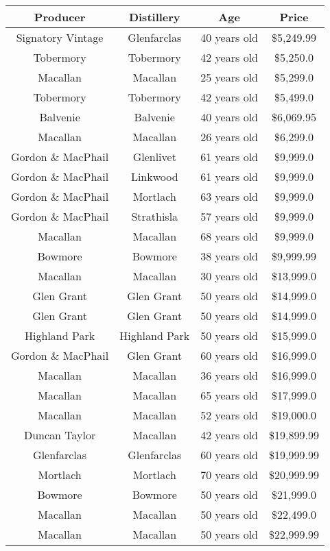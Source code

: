 \begin{appendices}
\begin{center}
 \begin{tabular}{||c | c | c | c  ||} 
 \hline
Producer & Distillery & Age & Price \\
 \hline
 \hline
Signatory Vintage & Glenfarclas & 40 years old & \$5,249.99\\
Tobermory & Tobermory & 42 years old & \$5,250.0\\
Macallan & Macallan & 25 years old & \$5,299.0\\
Tobermory & Tobermory & 42 years old & \$5,499.0\\
Balvenie & Balvenie & 40 years old & \$6,069.95\\
Macallan & Macallan & 26 years old & \$6,299.0\\
Gordon \& MacPhail & Glenlivet & 61 years old & \$9,999.0\\
Gordon \& MacPhail & Linkwood & 61 years old & \$9,999.0\\
Gordon \& MacPhail & Mortlach & 63 years old & \$9,999.0\\
Gordon \& MacPhail & Strathisla & 57 years old & \$9,999.0\\
Macallan & Macallan & 68 years old & \$9,999.0\\
Bowmore & Bowmore & 38 years old & \$9,999.99\\
Macallan & Macallan & 30 years old & \$13,999.0\\
Glen Grant & Glen Grant & 50 years old & \$14,999.0\\
Glen Grant & Glen Grant & 50 years old & \$14,999.0\\
Highland Park & Highland Park & 50 years old & \$15,999.0\\
Gordon \& MacPhail & Glen Grant & 60 years old & \$16,999.0\\
Macallan & Macallan & 36 years old & \$16,999.0\\
Macallan & Macallan & 65 years old & \$17,999.0\\
Macallan & Macallan & 52 years old & \$19,000.0\\
Duncan Taylor & Macallan & 42 years old & \$19,899.99\\
Glenfarclas & Glenfarclas & 60 years old & \$19,999.99\\
Mortlach & Mortlach & 70 years old & \$20,999.99\\
Bowmore & Bowmore & 50 years old & \$21,999.0\\
Macallan & Macallan & 50 years old & \$22,499.0\\
Macallan & Macallan & 50 years old & \$22,999.99\\

\end{tabular}
\end{center}
\end{appendices}
